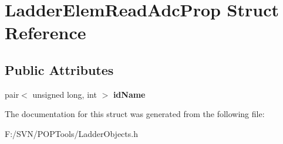 \hypertarget{struct_ladder_elem_read_adc_prop}{\section{Ladder\-Elem\-Read\-Adc\-Prop Struct Reference}
\label{struct_ladder_elem_read_adc_prop}
}
\subsection*{Public Attributes}
\begin{DoxyCompactItemize}
\item 
\hypertarget{struct_ladder_elem_read_adc_prop_a4d152c6dd348f7a0cb5788d9da5635b8}{pair$<$ unsigned long, int $>$ {\bfseries id\-Name}}\label{struct_ladder_elem_read_adc_prop_a4d152c6dd348f7a0cb5788d9da5635b8}

\end{DoxyCompactItemize}


The documentation for this struct was generated from the following file\-:\begin{DoxyCompactItemize}
\item 
F\-:/\-S\-V\-N/\-P\-O\-P\-Tools/Ladder\-Objects.\-h\end{DoxyCompactItemize}
